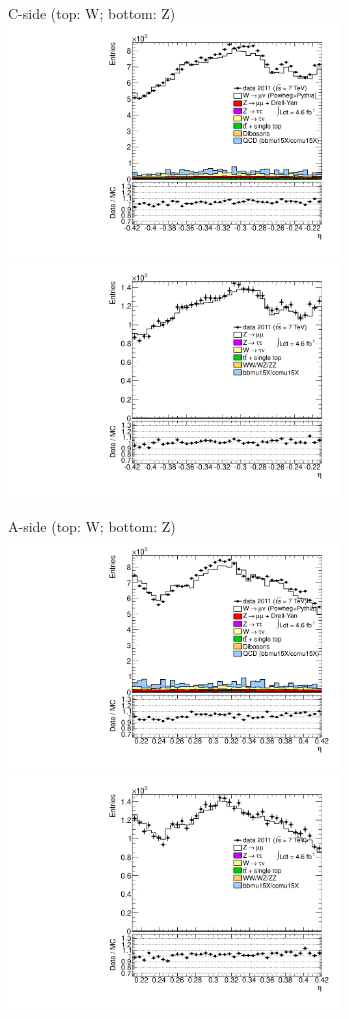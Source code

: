 {

\colb[T]

C-side (top: W; bottom: Z)
\centering
\includegraphics[width=0.66\textwidth]{dates/20130306/figures/etaphi/W_2_C_stack_l_eta_NEG} \\
\includegraphics[width=0.66\textwidth]{dates/20130306/figures/etaphi/Z_2_C_stack_lN_eta_ALL.pdf}

A-side (top: W; bottom: Z)
\centering
\includegraphics[width=0.66\textwidth]{dates/20130306/figures/etaphi/W_2_A_stack_l_eta_NEG} \\
\includegraphics[width=0.66\textwidth]{dates/20130306/figures/etaphi/Z_2_A_stack_lN_eta_ALL.pdf} 

\cole
}


